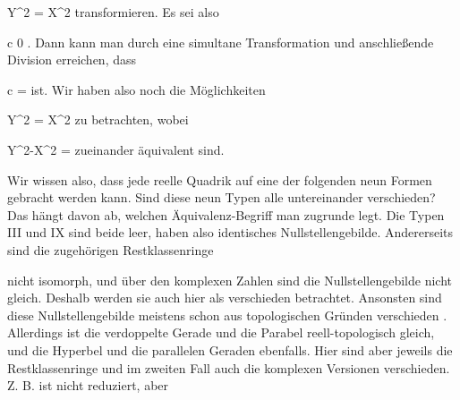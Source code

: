 {\mavergleichskette
{\vergleichskette
{ Y^2
}
{ = }{ \pm X^2
}
{  }{
}
{    }{
}
{   }{
}
}
{}{}{}
transformieren. Es sei also

\mavergleichskette
{\vergleichskette
{ c
}
{ \neq }{ 0
}
{  }{
}
{    }{
}
{   }{
}
}
{}{}{.}
Dann kann man durch eine simultane Transformation
 {} {}
und anschließende Division erreichen, dass

\mavergleichskette
{\vergleichskette
{ c
}
{ = }{ 
}
{  }{
}
{    }{
}
{   }{
}
}
{}{}{}
ist. Wir haben also noch die Möglichkeiten

\mavergleichskette
{\vergleichskette
{ Y^2
}
{ = }{ \pm X^2 
}
{  }{
}
{    }{
}
{   }{
}
}
{}{}{}
zu betrachten, wobei

\mavergleichskettedisp
{\vergleichskette
{ Y^2-X^2
}
{ =} { 
}
{ } {
}
{ } {
}
{ } {
}
}
{}{}{}
zueinander äquivalent sind.

Wir wissen also, dass jede reelle Quadrik auf eine der folgenden neun Formen gebracht werden kann.
Sind diese neun Typen alle untereinander verschieden? Das hängt davon ab, welchen Äquivalenz-Begriff man zugrunde legt. Die Typen III und IX sind beide leer, haben also identisches Nullstellengebilde. Andererseits sind die zugehörigen Restklassenringe

 {  }

nicht isomorph, und über den komplexen Zahlen sind die Nullstellengebilde nicht gleich. Deshalb werden sie auch hier als verschieden betrachtet. Ansonsten sind diese Nullstellengebilde meistens schon aus topologischen Gründen verschieden
 {} {.}
Allerdings ist die verdoppelte Gerade und die Parabel reell-topologisch gleich, und die Hyperbel und die parallelen Geraden ebenfalls. Hier sind aber jeweils die Restklassenringe und im zweiten Fall auch die komplexen Versionen verschieden. Z. B. ist
 nicht reduziert, aber

}
